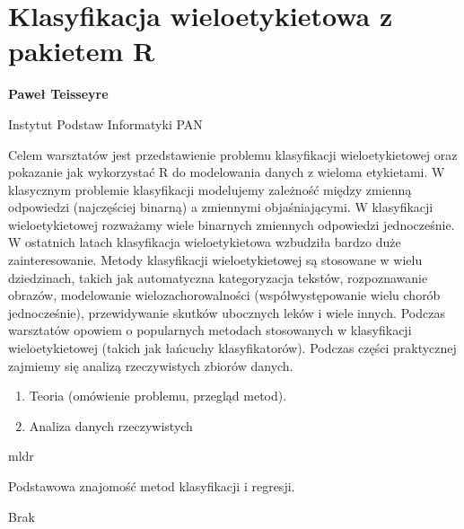 \documentclass[\main/boa.tex]{subfiles}
\begin{document}
\section{Klasyfikacja wieloetykietowa z pakietem R}

\begin{minipage}{0.915\textwidth}
\centering
{\bf {} Paweł Teisseyre}
\end{minipage}

\vskip 0.3cm

\begin{affiliations}
\begin{minipage}{0.915\textwidth}
\centering
\large Instytut Podstaw Informatyki PAN  \\[2pt]
\end{minipage}
\end{affiliations}

\vskip 0.8cm

\opiswarsztatu Celem warsztatów jest przedstawienie problemu klasyfikacji wieloetykietowej oraz pokazanie jak wykorzystać R do modelowania danych z wieloma etykietami. W klasycznym problemie klasyfikacji modelujemy zależność między zmienną odpowiedzi (najczęściej binarną) a zmiennymi objaśniającymi. W klasyfikacji wieloetykietowej rozważamy wiele binarnych zmiennych odpowiedzi jednocześnie. W ostatnich latach klasyfikacja wieloetykietowa wzbudziła bardzo duże zainteresowanie. Metody klasyfikacji wieloetykietowej są stosowane w wielu dziedzinach, takich jak automatyczna kategoryzacja tekstów, rozpoznawanie obrazów, modelowanie wielozachorowalności (współwystępowanie wielu chorób jednocześnie), przewidywanie skutków ubocznych leków i wiele innych. Podczas warsztatów opowiem o popularnych metodach stosowanych w klasyfikacji wieloetykietowej (takich jak łańcuchy klasyfikatorów). Podczas części praktycznej zajmiemy się analizą rzeczywistych zbiorów danych.

\planwarsztatu
\begin{enumerate}
\item Teoria (omówienie problemu, przegląd metod).
\item Analiza danych rzeczywistych
\end{enumerate}	 

\pakiety mldr

\umiejetnosci Podstawowa znajomość metod klasyfikacji i regresji.

\wymagania Brak
\end{document}
